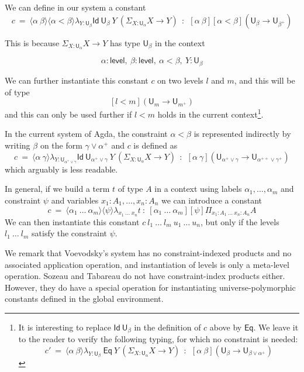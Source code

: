 \documentclass[a4paper,UKenglish,cleveref, autoref, thm-restate]{lipics-v2021}
\newcommand{\Id}{\mathsf{Id}}
\newcommand{\Eq}{\mathsf{Eq}}
\newcommand{\UU}{\mathsf{U}}
\newcommand{\Level}{\mathsf{level}}
\newcommand{\lam}[1]{{\langle}#1{\rangle}}
\begin{document}
We can define in our system a constant
$$
c~=~\lam{\alpha~\beta}\lam{\alpha<\beta}\lambda_{Y:\UU_{\beta}}\Id~{\UU_{\beta}}~Y~ (\Sigma_{X:\UU_{\alpha}}X\rightarrow Y)~~:~~
   [\alpha~\beta][\alpha<\beta](\UU_{\beta} \rightarrow \UU_{\beta^+})
$$

   This is because $\Sigma_{X:\UU_{\alpha}}X\rightarrow Y$ has type $\UU_{\beta}$ in the context

   $$\alpha:\Level,~\beta:\Level,~\alpha<\beta,~Y:\UU_{\beta}$$

   We can further instantiate this constant $c$ on two levels $l$ and $m$, and this will be of type
   $$[l<m](\UU_{m} \rightarrow \UU_{m^+})$$
   and this can only be used further if $l<m$ holds in the current
   context\footnote{It is interesting to replace $\Id~\UU_\beta$ in the
   definition of
$c$ above by $\Eq$. We leave it to the reader to verify the
following typing, for which no constraint is needed:
$$
c'~=~\lam{\alpha~\beta}\lambda_{Y:\UU_{\beta}}~\Eq~Y~ (\Sigma_{X:\UU_{\alpha}}X\rightarrow Y)~~:~~
   [\alpha~\beta](\UU_{\beta} \rightarrow \UU_{\beta\vee\alpha^+})
$$}.

\medskip


In the current system of Agda, the constraint $\alpha<\beta$ is represented indirectly by
writing $\beta$ on the form $\gamma\vee \alpha^+$ and $c$ is defined as
$$
c~=~\lam{\alpha~\gamma}\lambda_{Y:\UU_{\alpha^+\vee\gamma}}\Id~{\UU_{\alpha^+\vee\gamma}}~Y~ (\Sigma_{X:\UU_{\alpha}}X\rightarrow Y)~~:~~[\alpha~\gamma]  (\UU_{\alpha^+\vee\gamma} \rightarrow \UU_{\alpha^{++}\vee\gamma^+})
$$
   which arguably is less readable.

\medskip

In general, if we  build a term $t$ of type $A$ in a context using labels $\alpha_1,\dots,\alpha_m$
and constraint $\psi$ and variables $x_1:A_1,\dots,x_n:A_n$ we can introduce a constant
$$
c~=~ \lam{\alpha_1~\dots~\alpha_m}\lam{\psi}\lambda_{x_1~\dots~x_n}t ~:~
[\alpha_1~\dots~\alpha_m][\psi]\Pi_{x_1:A_1~\dots~x_n:A_n}A
$$
We can then instantiate this constant $c~l_1~\dots~l_m~u_1~\dots~u_n$, but only if the levels
$l_1~\dots~l_m$ satisfy the constraint $\psi$.

We remark that Voevodsky's system \cite{VV} has no constraint-indexed products and no associated application operation, and instantiation of levels is only a meta-level operation. Sozeau and Tabareau \cite{SozeauTabareau:coq} do not have constraint-index products either. However, they do have a special operation
 for instantiating universe-polymorphic constants defined in the global environment.
\end{document}
